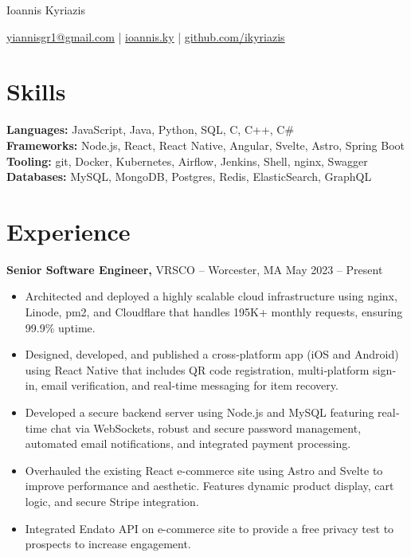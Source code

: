 \documentclass[11pt]{article}       %
\begin{document}
\centerline{\Huge Ioannis Kyriazis}

\vspace{5pt}

\centerline{\href{mailto:yiannisgr1@gmail.com}{yiannisgr1@gmail.com} | \href{https://ioannis.ky}{ioannis.ky} | \href{https://github.com/ikyriazis}{github.com/ikyriazis}}

\vspace{-10pt}

\section*{Skills}
\textbf{Languages:} JavaScript, Java, Python, SQL, C, C++, C\# \\
\textbf{Frameworks:} Node.js, React, React Native, Angular, Svelte, Astro, Spring Boot \\
\textbf{Tooling:} git, Docker, Kubernetes, Airflow, Jenkins, Shell, nginx, Swagger \\
\textbf{Databases:} MySQL, MongoDB, Postgres, Redis, ElasticSearch, GraphQL


\vspace{-6.5pt}

\section*{Experience}
\textbf{Senior Software Engineer,} {VRSCO} -- Worcester, MA \hfill May 2023 -- Present \\
\vspace{-9pt}
\begin{itemize}
  \item Architected and deployed a highly scalable cloud infrastructure using nginx, Linode, pm2, and Cloudflare that handles 195K+ monthly requests, ensuring 99.9\% uptime.
  \item Designed, developed, and published a cross‐platform app (iOS and Android) using React Native that includes QR code registration, multi‐platform sign‐in, email verification, and real-time messaging for item recovery.
  \item Developed a secure backend server using Node.js and MySQL featuring real‐time chat via WebSockets, robust and secure password management, automated email notifications, and integrated payment processing.
  \item Overhauled the existing React e-commerce site using Astro and Svelte to improve performance and aesthetic. Features dynamic product display, cart logic, and secure Stripe integration.
  \item Integrated Endato API on e-commerce site to provide a free privacy test to prospects to increase engagement.
\end{itemize}
\end{document}

